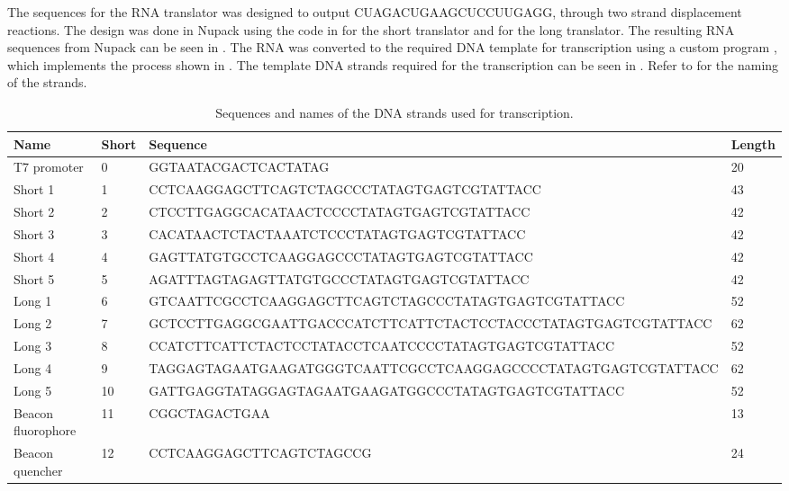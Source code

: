 The sequences for the RNA translator was designed to output CUAGACUGAAGCUCCUUGAGG, through two strand displacement reactions. The design was done in Nupack using the code in  for the short translator and  for the long translator. The resulting RNA sequences from Nupack can be seen in . The RNA was converted to the required DNA template for transcription using a custom program \cite{nupackorder}, which implements the process shown in . The template DNA strands required for the transcription can be seen in . Refer to  for the naming of the strands.

\begin{table}
\begin{adjustbox}{width=\columnwidth}
\begin{tabular}{llll}
\hline
\textbf{Name}      & \textbf{Short} & \textbf{Sequence}                                           & \textbf{Length} \\
\hline
T7 promoter        & 0          & GGTAATACGACTCACTATAG                                           & 20     \\
Short 1            & 1          & CCTCAAGGAGCTTCAGTCTAGCCCTATAGTGAGTCGTATTACC                    & 43     \\
Short 2            & 2          & CTCCTTGAGGCACATAACTCCCCTATAGTGAGTCGTATTACC                     & 42     \\
Short 3            & 3          & CACATAACTCTACTAAATCTCCCTATAGTGAGTCGTATTACC                     & 42     \\
Short 4            & 4          & GAGTTATGTGCCTCAAGGAGCCCTATAGTGAGTCGTATTACC                    & 42     \\
Short 5            & 5          & AGATTTAGTAGAGTTATGTGCCCTATAGTGAGTCGTATTACC                     & 42     \\
Long 1             & 6          & GTCAATTCGCCTCAAGGAGCTTCAGTCTAGCCCTATAGTGAGTCGTATTACC           & 52     \\
Long 2             & 7          & GCTCCTTGAGGCGAATTGACCCATCTTCATTCTACTCCTACCCTATAGTGAGTCGTATTACC & 62     \\
Long 3             & 8          & CCATCTTCATTCTACTCCTATACCTCAATCCCCTATAGTGAGTCGTATTACC           & 52     \\
Long 4             & 9          & TAGGAGTAGAATGAAGATGGGTCAATTCGCCTCAAGGAGCCCCTATAGTGAGTCGTATTACC & 62     \\
Long 5             & 10         & GATTGAGGTATAGGAGTAGAATGAAGATGGCCCTATAGTGAGTCGTATTACC           & 52     \\
Beacon fluorophore & 11         & CGGCTAGACTGAA                                                  & 13     \\
Beacon quencher    & 12         & CCTCAAGGAGCTTCAGTCTAGCCG                                       & 24 \\
\hline
\end{tabular}
\end{adjustbox}
\caption{Sequences and names of the DNA strands used for transcription.}
\label{dna_strands}
\end{table}


